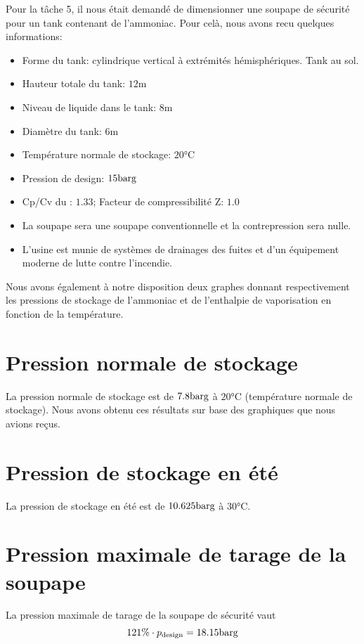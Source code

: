 Pour la t\^ache 5, il nous était demandé de dimensionner une soupape de sécurité
pour un tank contenant de l'ammoniac. Pour celà, nous avons recu quelques informations:

\begin{itemize}

\item Forme du tank: cylindrique vertical à extrémités hémisphériques. Tank au sol.
\item Hauteur totale du tank: $12 \si{\metre}$
\item Niveau de  liquide dans le tank: $8\si{\metre}$
\item Diamètre du tank: $6 \si{\metre}$
\item Température normale de stockage: $20 \si{\degreeCelsius}$
\item Pression de design: $15 \si{\bar}\text{g}$
\item Cp/Cv du : $1.33$; Facteur de compressibilité Z: $1.0$
\item La soupape sera une soupape conventionnelle et la contrepression sera nulle.
\item L’usine est munie de systèmes de drainages des fuites 
	et d’un équipement moderne de lutte contre l’incendie.
\end{itemize}

Nous avons également à notre disposition deux graphes donnant respectivement 
les pressions de stockage de l'ammoniac et de l'enthalpie de vaporisation 
en fonction de la température. 

\section{Pression normale de stockage} 
La pression normale de stockage est de $7.8 \si{\bar}\text{g}$ à $20\si{\celsius}$ 
(température normale de stockage). Nous avons obtenu ces résultats sur base des
graphiques que nous avions reçus.

\section{Pression de stockage en été} 
La pression de stockage en été est de $10.625 \si{\bar}\text{g}$ à $30\si{\celsius}$.

\section{Pression maximale de tarage de la soupape} 
La pression maximale de tarage de la soupape de sécurité vaut 
\[ 121\% \cdot p_{\text{design}} = 18.15 \si{\bar}\text{g} \]

